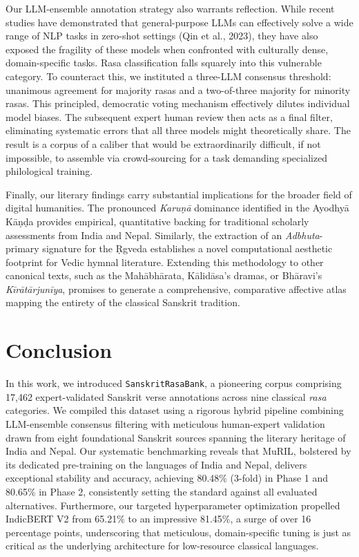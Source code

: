 \documentclass[11pt]{article}
\begin{document}
Our LLM-ensemble annotation strategy also warrants reflection. While recent studies have demonstrated that general-purpose LLMs can effectively solve a wide range of NLP tasks in zero-shot settings (Qin et al., 2023), they have also exposed the fragility of these models when confronted with culturally dense, domain-specific tasks. Rasa classification falls squarely into this vulnerable category. To counteract this, we instituted a three-LLM consensus threshold: unanimous agreement for majority rasas and a two-of-three majority for minority rasas. This principled, democratic voting mechanism effectively dilutes individual model biases. The subsequent expert human review then acts as a final filter, eliminating systematic errors that all three models might theoretically share. The result is a corpus of a caliber that would be extraordinarily difficult, if not impossible, to assemble via crowd-sourcing for a task demanding specialized philological training.

Finally, our literary findings carry substantial implications for the broader field of digital humanities. The pronounced \textit{Karu\d n\=a} dominance identified in the Ayodhy\=a K\=a\d n\d da provides empirical, quantitative backing for traditional scholarly assessments from India and Nepal. Similarly, the extraction of an \textit{Adbhuta}-primary signature for the \d Rgveda establishes a novel computational aesthetic footprint for Vedic hymnal literature. Extending this methodology to other canonical texts, such as the Mah\=abh\=arata, K\=alid\=asa's dramas, or Bh\=aravi's \textit{K\=ir\=at\=arjun\=iya}, promises to generate a comprehensive, comparative affective atlas mapping the entirety of the classical Sanskrit tradition.

\section{Conclusion}

In this work, we introduced \texttt{SanskritRasaBank}, a pioneering corpus comprising 17,462 expert-validated Sanskrit verse annotations across nine classical \textit{rasa} categories. We compiled this dataset using a rigorous hybrid pipeline combining LLM-ensemble consensus filtering with meticulous human-expert validation drawn from eight foundational Sanskrit sources spanning the literary heritage of India and Nepal. Our systematic benchmarking reveals that MuRIL, bolstered by its dedicated pre-training on the languages of India and Nepal, delivers exceptional stability and accuracy, achieving 80.48\% (3-fold) in Phase 1 and 80.65\% in Phase 2, consistently setting the standard against all evaluated alternatives. Furthermore, our targeted hyperparameter optimization propelled IndicBERT V2 from 65.21\% to an impressive 81.45\%, a surge of over 16 percentage points, underscoring that meticulous, domain-specific tuning is just as critical as the underlying architecture for low-resource classical languages.
\end{document}
